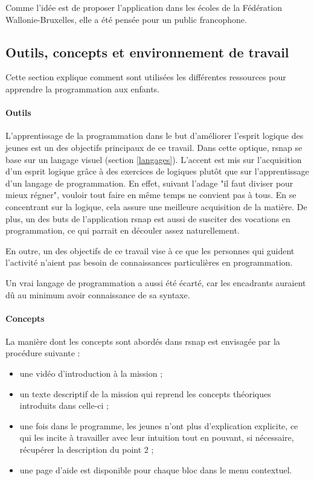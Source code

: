 Comme l'idée est de proposer l'application dans les écoles de la Fédération Wallonie-Bruxelles, elle a été pensée pour un public francophone.

\subsection{Outils, concepts et environnement de travail}
Cette section explique comment sont utilisées les différentes ressources pour apprendre la programmation aux enfants.

\paragraph{Outils}
\label{outil}
L'apprentissage de la programmation dans le but d'améliorer l'esprit logique des jeunes est un des objectifs principaux de ce travail. Dans cette optique, \gls{rsnap} se base sur un langage visuel (section \ref{langages}). L'accent est mis sur l'acquisition d'un esprit logique grâce à des exercices de logiques plutôt que sur l'apprentissage d'un langage de programmation.  En effet, suivant l'adage "il faut diviser pour mieux régner", vouloir tout faire en même temps ne convient pas à tous. En se concentrant sur la logique, cela assure une meilleure acquisition de la matière. De plus, un des buts de l'application \gls{rsnap} est aussi de susciter des vocations en programmation, ce qui parrait en découler assez naturellement.

En outre, un des objectifs de ce travail vise à ce que les personnes qui guident l'activité n'aient pas besoin de connaissances particulières en programmation. 

Un vrai langage de programmation a aussi été écarté, car les encadrants auraient dû au minimum avoir connaissance de sa syntaxe.

\paragraph{Concepts}
La manière dont les concepts sont abordés dans \gls{rsnap} est envisagée par la procédure suivante :
\begin{itemize}
	\item une vidéo d'introduction à la \gls{mission} ;
	\item un texte descriptif de la \gls{mission} qui reprend les concepts théoriques introduits dans celle-ci ;
	\item une fois dans le programme, les jeunes n'ont plus d'explication explicite, ce qui les incite à travailler avec leur intuition tout en pouvant, si nécessaire, récupérer la description du point 2 ;
	\item une page d'aide est disponible pour chaque \gls{bloc} dans le menu contextuel.
\end{itemize}

